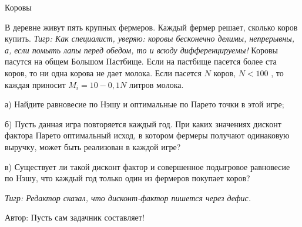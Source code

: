 \begin{problem}
 Коровы\par
В деревне живут пять крупных фермеров. Каждый фермер решает, сколько коров купить. {\it Тигр: Как специалист, уверяю: коровы  бесконечно делимы, непрерывны, а, если помыть лапы перед обедом, то и  всюду  дифференцируемы!} Коровы пасутся на общем Большом Пастбище. Если на пастбище пасется более ста коров, то ни одна корова не дает молока. Если пасется  $N$  коров,  $N<100$ , то каждая приносит  $M_{i} =10-0,1N$  литров молока.\par
а) Найдите равновесие по Нэшу и оптимальные по Парето точки в этой игре;\par
б) Пусть данная игра повторяется каждый год. При каких значениях дисконт фактора Парето оптимальный исход, в котором фермеры получают одинаковую выручку, может быть реализован в каждой игре?\par
в) Существует ли такой дисконт фактор и совершенное подыгровое равновесие по Нэшу, что каждый год только один из фермеров покупает коров?\par
{\it Тигр: Редактор сказал, что дисконт-фактор пишется через дефис.}\par
Автор: Пусть сам задачник составляет!



\begin{sol}

\end{sol}
\end{problem}



